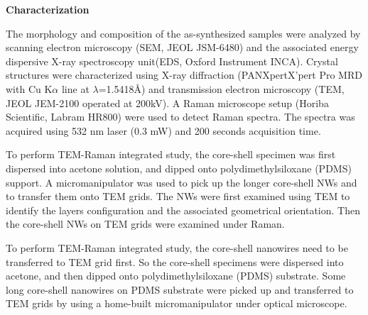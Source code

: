 \documentclass[11pt]{article} %
\begin{document}
\textbf{Characterization}

The morphology and composition of the as-synthesized samples were analyzed by scanning electron microscopy (SEM, JEOL JSM-6480) and the associated energy dispersive X-ray spectroscopy unit(EDS, Oxford Instrument INCA). Crystal structures were characterized using X-ray diffraction (PANXpertX’pert Pro MRD with Cu K$\alpha$ line at $\lambda$=1.5418\AA) and transmission electron microscopy (TEM, JEOL JEM-2100  operated at 200kV). A Raman microscope setup (Horiba Scientific, Labram HR800) were used to detect Raman spectra. The spectra was acquired using 532 nm laser (0.3 mW) and 200 seconds acquisition time.

To perform TEM-Raman integrated study, the core-shell specimen was first dispersed into acetone solution, and dipped onto polydimethylsiloxane (PDMS) support. A micromanipulator was used to pick up the longer core-shell NWs and to transfer them onto TEM grids. The NWs were first examined using TEM to identify the  layers configuration and the associated geometrical orientation. Then the core-shell NWs on TEM grids were examined under Raman.

To perform TEM-Raman integrated study, the core-shell nanowires need to be transferred to TEM grid first. So the core-shell specimens were dispersed into acetone, and then dipped onto polydimethylsiloxane (PDMS) substrate. Some long core-shell nanowires on PDMS substrate were picked up and transferred to TEM grids by using a home-built micromanipulator under optical microscope.
\end{document}
